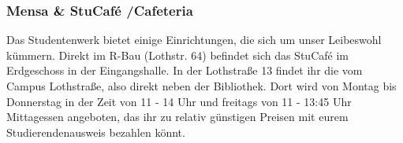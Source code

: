 \subsubsection{Mensa \& StuCafé /Cafeteria}
Das Studentenwerk bietet einige Einrichtungen, die sich um unser 
Leibeswohl kümmern. Direkt im R-Bau (Lothstr. 64) befindet sich das 
StuCafé im Erdgeschoss in der Eingangshalle. 
In der Lothstraße 13 findet ihr die  vom Campus Lothstraße, 
also direkt neben der Bibliothek. Dort wird von Montag bis 
Donnerstag in der Zeit von 11 - 14 Uhr und freitags von 11 - 13:45 Uhr 
Mittagessen angeboten, das ihr zu relativ günstigen Preisen mit eurem 
Studierendenausweis bezahlen könnt. 